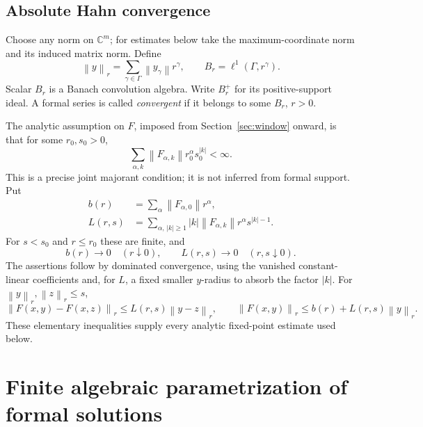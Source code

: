 \documentclass[11pt,a4paper]{article}
\numberwithin{equation}{section}
\theoremstyle{definition}
\theoremstyle{remark}
\newcommand{\C}{\mathbb C}
\newcommand{\G}{\Gamma}
\newcommand{\norm}[1]{\left\lVert #1\right\rVert}
\begin{document}
\subsection{Absolute Hahn convergence}
Choose any norm on $\C^m$; for estimates below take the maximum-coordinate
norm and its induced matrix norm. Define
\begin{equation}\label{eq:norm}
 \norm{y}_r=\sum_{\gamma\in\G}\norm{y_\gamma}r^\gamma,
 \qquad B_r=\ell^1(\G,r^\gamma).
\end{equation}
Scalar $B_r$ is a Banach convolution algebra. Write $B_r^+$ for its
positive-support ideal. A formal series is called \emph{convergent} if it
belongs to some $B_r$, $r>0$.

The analytic assumption on $F$, imposed from Section~\ref{sec:window}
onward, is that for some $r_0,s_0>0$,
\begin{equation}\label{eq:analytic-F}
 \sum_{\alpha,k}\norm{F_{\alpha,k}}r_0^\alpha s_0^{|k|}<\infty.
\end{equation}
This is a precise joint majorant condition; it is not inferred from formal
support. Put
\begin{align}
 b(r)&=\sum_\alpha\norm{F_{\alpha,0}}r^\alpha,\label{eq:b}\\
 L(r,s)&=\sum_{\alpha,\,|k|\geq1}
   |k|\norm{F_{\alpha,k}}r^\alpha s^{|k|-1}.
 \label{eq:L}
\end{align}
For $s<s_0$ and $r\leq r_0$ these are finite, and
\begin{equation}\label{eq:smallness}
 b(r)\longrightarrow0\quad(r\downarrow0),\qquad
 L(r,s)\longrightarrow0\quad(r,s\downarrow0).
\end{equation}
The assertions follow by dominated convergence, using the vanished
constant-linear coefficients and, for $L$, a fixed smaller $y$-radius to
absorb the factor $|k|$. For $\norm{y}_r,\norm{z}_r\leq s$,
\begin{equation}\label{eq:lipschitz}
 \norm{F(x,y)-F(x,z)}_r\leq L(r,s)\norm{y-z}_r,
 \qquad \norm{F(x,y)}_r\leq b(r)+L(r,s)\norm{y}_r.
\end{equation}
These elementary inequalities supply every analytic fixed-point estimate
used below.

\section{Finite algebraic parametrization of formal solutions}
\label{sec:formal}
\end{document}
